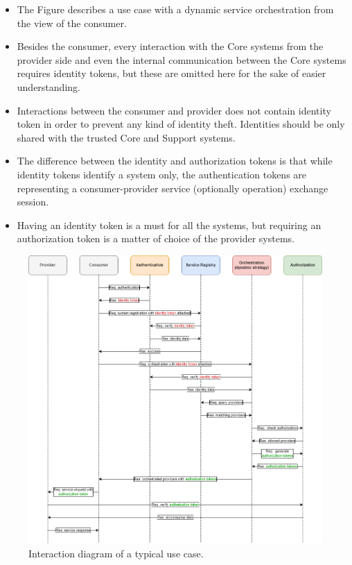\documentclass[a4paper]{arrowhead}
\begin{document}
\begin{itemize}
    \item The Figure describes a use case with a dynamic service orchestration from the view of the consumer.
    \item Besides the consumer, every interaction with the Core systems from the provider side and even the internal communication between the Core systems requires identity tokens, but these are omitted here for the sake of easier understanding.
    \item Interactions between the consumer and provider does not contain identity token in order to prevent any kind of identity theft. Identities should be only shared with the trusted Core and Support systems.
    \item The difference between the identity and authorization tokens is that while identity tokens identify a system only, the authentication tokens are representing a consumer-provider service (optionally operation) exchange session.
    \item Having an identity token is a must for all the systems, but requiring an authorization token is a matter of choice of the provider systems.
\end{itemize}

\begin{figure}[ht!]
  \centering
  \includegraphics[width=\textwidth]{figures/auth_interactions}
  \caption{Interaction diagram of a typical use case. }
  \label{fig:auth_interactions}
\end{figure}
\end{document}
